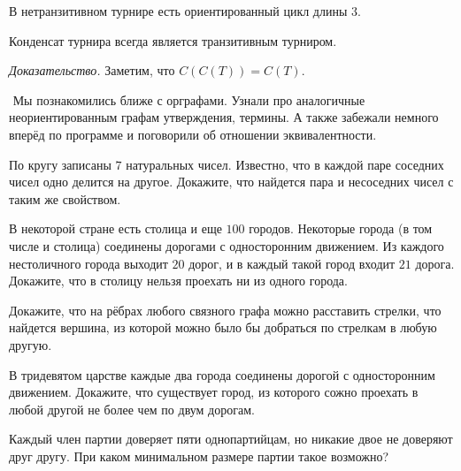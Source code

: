 \begin{consequence}
	В нетранзитивном турнире есть ориентированный цикл длины 3.
\end{consequence}

\begin{consequence}
	Конденсат турнира всегда является транзитивным турниром.
	
	\emph{Доказательство.} Заметим, что $C(C(T)) = C(T)$.
\end{consequence}

$ $
\newline
	Мы познакомились ближе с орграфами. Узнали про аналогичные неориентированным графам утверждения, термины. 
	А также забежали немного вперёд по программе и поговорили об отношении эквивалентности.


\begin{exersize}
	По кругу записаны $7$ натуральных чисел. Известно, что в каждой паре соседних чисел одно делится на другое. 
	Докажите, что найдется пара и несоседних чисел с таким же свойством.
\end{exersize}

\begin{exersize}
	В некоторой стране есть столица и еще $100$ городов. Некоторые города (в том числе и столица) соединены 
	дорогами с односторонним движением. Из каждого нестоличного города выходит $20$ дорог, и в каждый 
	такой город входит $21$ дорога. Докажите, что в столицу нельзя проехать ни из одного города.	
\end{exersize}

\begin{exersize}
	Докажите, что на рёбрах любого связного графа можно расставить стрелки, что найдется вершина, из которой 
	можно было бы добраться по стрелкам в любую другую.
\end{exersize}

\begin{exersize}
	В тридевятом царстве каждые два города соединены дорогой с односторонним движением. Докажите, что существует город, 
	из которого сожно проехать в любой другой не более чем по двум дорогам.
\end{exersize}

\begin{exersize}
	Каждый член партии доверяет пяти однопартийцам, но никакие двое не доверяют друг другу. 
	При каком минимальном размере партии такое возможно?
\end{exersize}

